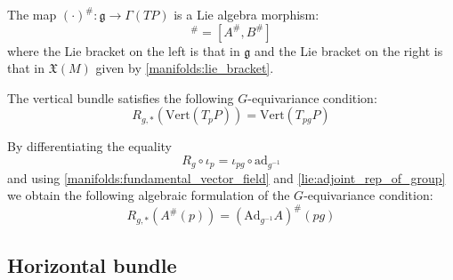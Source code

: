 	\begin{property}
		The map $(\cdot)^\#:\mathfrak{g}\rightarrow\Gamma(TP)$ is a Lie algebra morphism:
		\begin{equation}
			[A, B]^\# = [A^\#, B^\#]
		\end{equation}
		where the Lie bracket on the left is that in $\mathfrak{g}$ and the Lie bracket on the right is that in $\mathfrak{X}(M)$ given by \ref{manifolds:lie_bracket}.
	\end{property}
	
		\begin{property}
		The vertical bundle satisfies the following $G$-equivariance condition:
		\begin{equation}
			R_{g, \ast}(\text{Vert}(T_pP)) = \text{Vert}(T_{pg}P)
		\end{equation}
		
		By differentiating the equality \[R_g\circ\iota_p = \iota_{pg}\circ\text{ad}_{g^{-1}}\] and using \ref{manifolds:fundamental_vector_field} and \ref{lie:adjoint_rep_of_group} we obtain the following algebraic formulation of the $G$-equivariance condition:
		\begin{equation}
			R_{g, \ast}\left(A^\#(p)\right) = \left(\text{Ad}_{g^{-1}}A\right)^\#(pg)
		\end{equation}
	\end{property}
	
\subsection{Horizontal bundle}

